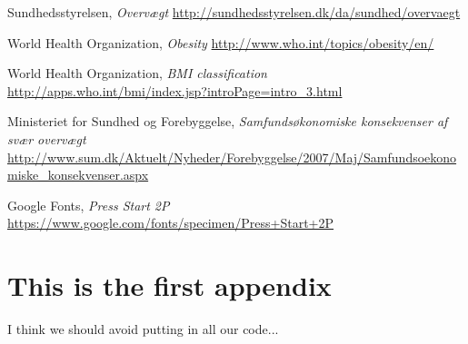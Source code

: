 \documentclass[11pt]{report}
\begin{document}
\begin{thebibliography}{9}
  Sundhedsstyrelsen,
  \emph{Overv\ae gt}
  \url{http://sundhedsstyrelsen.dk/da/sundhed/overvaegt}

	World Health Organization,
	\emph{Obesity}
	\url{http://www.who.int/topics/obesity/en/}
	
	World Health Organization,
	\emph{BMI classification}
	\url{http://apps.who.int/bmi/index.jsp?introPage=intro_3.html}

	Ministeriet for Sundhed og Forebyggelse,
	\emph{Samfunds\o konomiske konsekvenser af sv\ae r overv\ae gt}
	\url{http://www.sum.dk/Aktuelt/Nyheder/Forebyggelse/2007/Maj/Samfundsoekonomiske_konsekvenser.aspx}

	Google Fonts, \emph{Press Start 2P}
	\url{https://www.google.com/fonts/specimen/Press+Start+2P}

\end{thebibliography}


\appendix

\chapter{This is the first appendix}
I think we should avoid putting in all our code...
\end{document}
